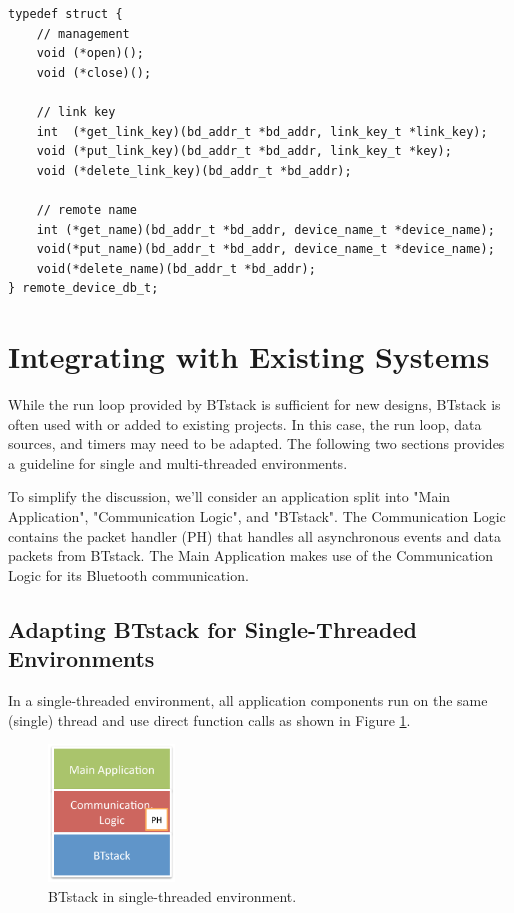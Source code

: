 \documentclass[a4paper,titlepage,oneside,12pt]{amsart} %
\begin{document}
\begin{lstlisting}[caption=Persistent Storage Interface., label=persistentDB]
typedef struct {
    // management
    void (*open)();
    void (*close)();
    
    // link key
    int  (*get_link_key)(bd_addr_t *bd_addr, link_key_t *link_key);
    void (*put_link_key)(bd_addr_t *bd_addr, link_key_t *key);
    void (*delete_link_key)(bd_addr_t *bd_addr);
    
    // remote name
    int (*get_name)(bd_addr_t *bd_addr, device_name_t *device_name);
    void(*put_name)(bd_addr_t *bd_addr, device_name_t *device_name);
    void(*delete_name)(bd_addr_t *bd_addr);
} remote_device_db_t;

\end{lstlisting}

\section{Integrating with Existing Systems}

While the run loop provided by BTstack is sufficient for new designs, BTstack is often used with or added to existing projects. In this case, the run loop, data sources, and timers may need to be adapted. The following two sections provides a guideline for single and multi-threaded environments.

To simplify the discussion, we'll consider an application split into "Main \mbox{Application}", "Communication Logic", and "BTstack". The Communication Logic contains the packet handler (PH) that handles all asynchronous events and data packets from BTstack. The Main Application makes use of the Communication Logic for its Bluetooth communication.

\subsection{Adapting BTstack for Single-Threaded Environments}
\label{section:singlethreading}

In a single-threaded environment, all application components run on the same (single) thread and use direct function calls as shown in Figure \ref{fig:BTstackSingle}.

\begin{figure}[htbp] %
   \centering
   \includegraphics[width=0.3\textwidth]{picts/singlethreading-btstack.pdf} 
   \caption{BTstack in single-threaded environment. }
   \label{fig:BTstackSingle}
\end{figure}
\end{document}
